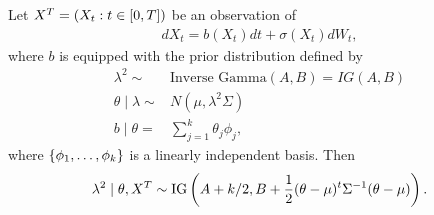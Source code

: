 \documentclass[12pt]{article}
\begin{document}
\begin{lemma}
	Let \(X^T=\left(X_t:t\in[0,T]\right)\) be an observation of 
	\begin{align*}
	dX_t=b(X_t)dt+\sigma(X_t)dW_t,
	\end{align*}
	where \(b\) is equipped with the prior distribution defined by 
	\begin{align*}
	\lambda^2 \sim & \text{Inverse Gamma}(A,B)=IG(A,B)\\
	\theta \mid \lambda \sim & N(\mu,\lambda^2\Sigma)\\
	b\mid \theta = & \sum_{j=1}^k\theta_j\phi_j,
	\end{align*}
	where \(\left\{ \phi_1,\ldots,\phi_k \right\}\) is a linearly independent basis. Then 
	\[
	\lambda^2 \mid \theta, X^T \sim \text{IG}\left( A + k/2 , B+ \frac12 (\theta-\mu)^t\Sigma^{-1}(\theta-\mu) \right).
	\] 
\end{lemma}
\end{document}
